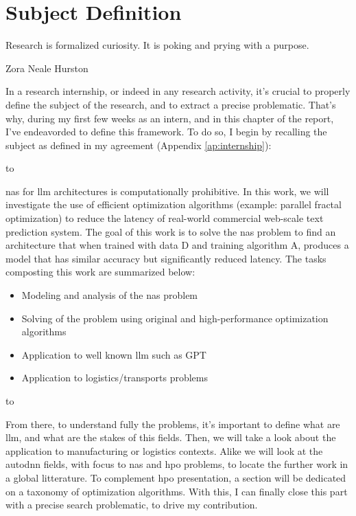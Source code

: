 \chapter{Subject Definition}
\label{chap:subject_def}

\epigraph{Research is formalized curiosity. It is poking and prying with a purpose.}{Zora Neale Hurston}

In a research internship, or indeed in any research activity, it's crucial to properly define the subject of the research, and to extract a precise problematic. That's why, during my first few weeks as an intern, and in this chapter of the report, I've endeavorded to define this framework. To do so, I begin by recalling the subject as defined in my agreement (Appendix \ref{ap:internship}):

\noindent\hbox to \textwidth{\hrulefill}

\acrshort{nas} for \acrshort{llm} architectures is computationally prohibitive. In this work, we will investigate the use of efficient optimization algorithms (example: parallel fractal optimization) to reduce the latency of real-world commercial web-scale text prediction system. The goal of this work is to solve the \acrshort{nas} problem to find an architecture that when trained with data D and training algorithm A, produces a model that has similar accuracy but significantly reduced latency.
The tasks composting this work are summarized below:
\begin{itemize}
    \item Modeling and analysis of the \acrshort{nas} problem
    \item Solving of the problem using original and high-performance optimization algorithms
    \item Application to well known \acrshort{llm} such as GPT
    \item Application to logistics/transports problems
\end{itemize}
\noindent\hbox to \textwidth{\hrulefill}


From there, to understand fully the problems, it's important to define what are \acrshort{llm}, and what are the stakes of this fields. Then, we will take a look about the application to manufacturing or logistics contexts. Alike we will look at the \acrshort{autodnn} fields, with focus to \acrshort{nas} and \acrshort{hpo} problems, to locate the further work in a global litterature. To complement \acrshort{hpo} presentation, a section will be dedicated on a taxonomy of optimization algorithms. With this, I can finally close this part with a precise search problematic, to drive my contribution.

